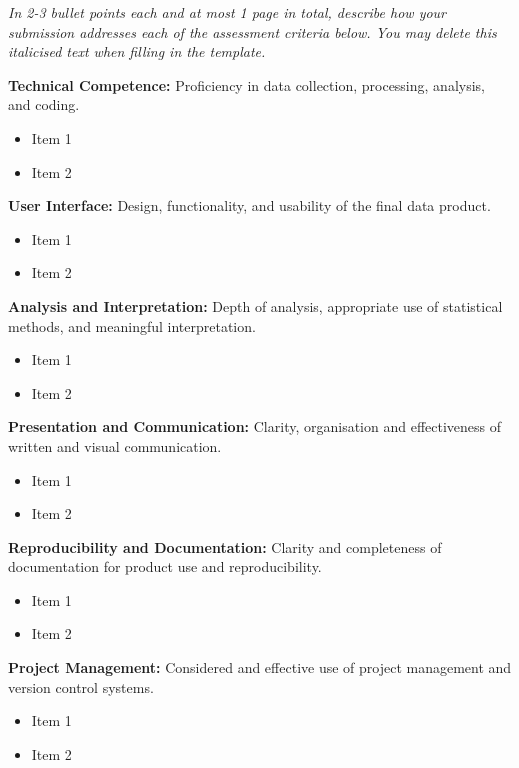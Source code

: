 \documentclass[a4paper, 12pt]{article}
\begin{document}
\textit{In 2-3 bullet points each and at most 1 page in total, describe how your submission addresses each of the assessment criteria below. You may delete this italicised text when filling in the template.} 

\textbf{Technical Competence:} Proficiency in data collection, processing, analysis, and coding.

\begin{itemize}
    \item Item 1
    \item Item 2
\end{itemize}

\textbf{User Interface:} Design, functionality, and usability of the final data product.

\begin{itemize}
    \item Item 1
    \item Item 2
\end{itemize}

\textbf{Analysis and Interpretation:} Depth of analysis, appropriate use of statistical methods, and meaningful interpretation.

\begin{itemize}
    \item Item 1
    \item Item 2
\end{itemize}

\textbf{Presentation and Communication:} Clarity, organisation and effectiveness of written and visual communication.

\begin{itemize}
    \item Item 1
    \item Item 2
\end{itemize}

\textbf{Reproducibility and Documentation:} Clarity and completeness of documentation for product use and reproducibility.

\begin{itemize}
    \item Item 1
    \item Item 2
\end{itemize}

\textbf{Project Management:} Considered and effective use of project management and version control systems.

\begin{itemize}
    \item Item 1
    \item Item 2
\end{itemize}
\end{document}
